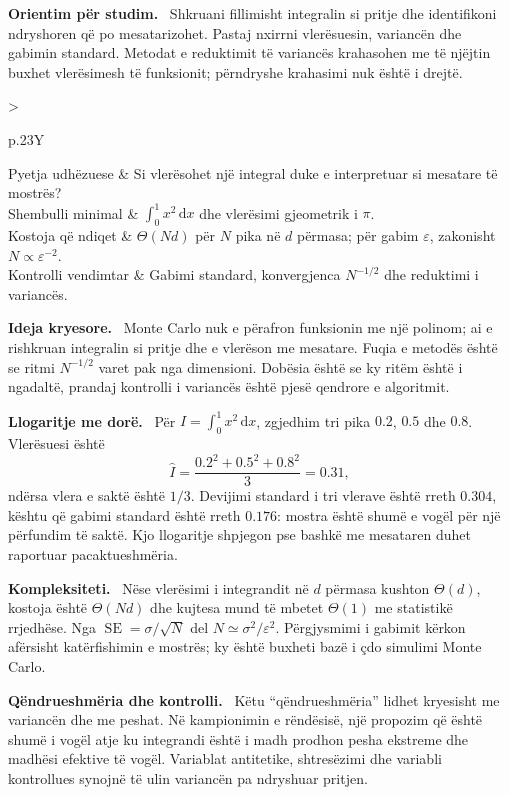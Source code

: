 \documentclass[11pt,oneside,openany]{book}
\newcommand{\dd}{\,\mathrm{d}}
\newenvironment{orientim}{\par\medskip\noindent\textbf{Orientim për studim.}\ }{\par\medskip}
\newenvironment{ideja}{\par\medskip\noindent\textbf{Ideja kryesore.}\ }{\par\medskip}
\newenvironment{llogaritjedore}{\par\medskip\noindent\textbf{Llogaritje me dorë.}\ }{\par\medskip}
\newenvironment{kompleksitet}{\par\medskip\noindent\textbf{Kompleksiteti.}\ }{\par\medskip}
\newenvironment{qendrueshmeri}{\par\medskip\noindent\textbf{Qëndrueshmëria dhe kontrolli.}\ }{\par\medskip}
\newcommand{\hartakapitullit}[4]{%
\par\smallskip
\noindent\begin{tabularx}{\textwidth}{>{\bfseries\raggedright\arraybackslash}p{.23\textwidth}Y}
Pyetja udhëzuese & #1\\
Shembulli minimal & #2\\
Kostoja që ndiqet & #3\\
Kontrolli vendimtar & #4
\end{tabularx}\par\medskip}
\begin{document}
\begin{orientim}
Shkruani fillimisht integralin si pritje dhe identifikoni ndryshoren që po
mesatarizohet. Pastaj nxirrni vlerësuesin, variancën dhe gabimin standard.
Metodat e reduktimit të variancës krahasohen me të njëjtin buxhet vlerësimesh
të funksionit; përndryshe krahasimi nuk është i drejtë.
\end{orientim}

\hartakapitullit
{Si vlerësohet një integral duke e interpretuar si mesatare të mostrës?}
{$\int_0^1x^2\dd x$ dhe vlerësimi gjeometrik i $\pi$.}
{$\Theta(Nd)$ për $N$ pika në $d$ përmasa; për gabim $\varepsilon$, zakonisht $N\propto\varepsilon^{-2}$.}
{Gabimi standard, konvergjenca $N^{-1/2}$ dhe reduktimi i variancës.}

\begin{ideja}
Monte Carlo nuk e përafron funksionin me një polinom; ai e rishkruan integralin
si pritje dhe e vlerëson me mesatare. Fuqia e metodës është se ritmi
$N^{-1/2}$ varet pak nga dimensioni. Dobësia është se ky ritëm është i ngadaltë,
prandaj kontrolli i variancës është pjesë qendrore e algoritmit.
\end{ideja}

\begin{llogaritjedore}
Për $I=\int_0^1x^2\dd x$, zgjedhim tri pika $0.2$, $0.5$ dhe $0.8$. Vlerësuesi
është
\begin{equation}
 \widehat I=\frac{0.2^2+0.5^2+0.8^2}{3}=0.31,
\end{equation}
ndërsa vlera e saktë është $1/3$. Devijimi standard i tri vlerave është
rreth $0.304$, kështu që gabimi standard është rreth $0.176$: mostra është
shumë e vogël për një përfundim të saktë. Kjo llogaritje shpjegon pse bashkë
me mesataren duhet raportuar pacaktueshmëria.
\end{llogaritjedore}

\begin{kompleksitet}
Nëse vlerësimi i integrandit në $d$ përmasa kushton $\Theta(d)$, kostoja është
$\Theta(Nd)$ dhe kujtesa mund të mbetet $\Theta(1)$ me statistikë rrjedhëse.
Nga $\operatorname{SE}=\sigma/\sqrt N$ del
$N\simeq\sigma^2/\varepsilon^2$. Përgjysmimi i gabimit kërkon afërsisht
katërfishimin e mostrës; ky është buxheti bazë i çdo simulimi Monte Carlo.
\end{kompleksitet}

\begin{qendrueshmeri}
Këtu ``qëndrueshmëria'' lidhet kryesisht me variancën dhe me peshat. Në
kampionimin e rëndësisë, një propozim që është shumë i vogël atje ku integrandi
është i madh prodhon pesha ekstreme dhe madhësi efektive të vogël. Variablat
antitetike, shtresëzimi dhe variabli kontrollues synojnë të ulin variancën pa
ndryshuar pritjen.
\end{qendrueshmeri}
\end{document}
